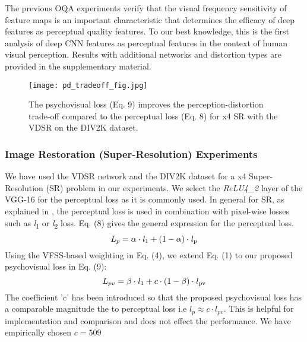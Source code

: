 \documentclass[10pt,twocolumn,letterpaper]{article}
\begin{document}
The previous OQA experiments verify that the visual frequency sensitivity of feature maps is an important characteristic that determines the efficacy of deep features as perceptual quality features. To our best knowledge, this is the first analysis of deep CNN features as perceptual features in the context of human visual perception. Results with additional networks and distortion types are provided in the supplementary material.

\begin{figure}[t!]
\texttt{[image: pd\_tradeoff\_fig.jpg]}
\caption{The psychovisual loss (Eq. 9) improves the perception-distortion trade-off compared to the perceptual loss (Eq. 8) for x4 SR with the VDSR on the DIV2K dataset.}
\end{figure}

\subsubsection{Image Restoration (Super-Resolution) Experiments}
We have used the VDSR \cite{26} network and the DIV2K dataset \cite{27} for a x4 Super-Resolution (SR) problem in our experiments. We select the \textit{ReLU4\_2} layer of the VGG-16 for the perceptual loss as it is commonly used. In general for SR, as explained in \cite{7}, the perceptual loss \cite{7} is used in combination with pixel-wise losses such as \textit{l}\textsubscript{1} or \textit{l}\textsubscript{2} loss. Eq. (8) gives the general expression for the perceptual loss.
\begin{equation}
   L_{p} = \alpha\cdot\mathit{l}\textsubscript{1} + (1-\alpha)\cdot\mathit{l}\textsubscript{p}
\end{equation}
Using the VFSS-based weighting in Eq. (4), we extend Eq. (1) to our proposed psychovisual loss in Eq. (9):
\begin{equation}
  L_{pv} = \beta\cdot\mathit{l}\textsubscript{1} + c\cdot(1-\beta)\cdot\mathit{l}\textsubscript{pv}
\end{equation}
The coefficient 'c' has been introduced so that the proposed psychovisual loss has a comparable magnitude the to perceptual loss i.e $l_{p}\approx c\cdot l_{pv}$. This is helpful for implementation and comparison and does not effect the performance. We have empirically chosen $c=509$
\end{document}

